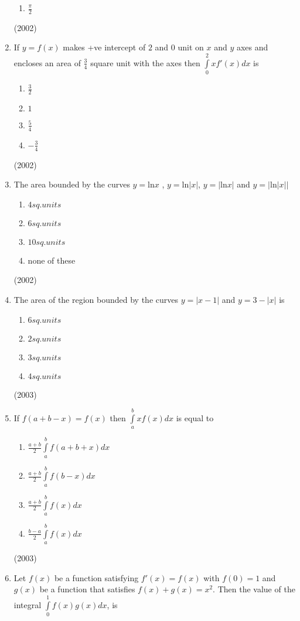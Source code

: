 \documentclass[journal,12pt,twocolumn]{IEEEtran}
\theoremstyle{remark}
\begin{document}
\begin{enumerate}
\begin{enumerate}
					\item $\frac{\pi}{2}$
			\end{enumerate}
			\hfill (2002)
	\item
	If $y=f(x)$ makes +ve intercept of $2$ and $0$ unit on $x$ and $y$ axes and encloses an area of $\frac{3}{4}$ square unit with the axes then $\int \limits_0^2 x f'(x)dx$ is
			\begin{enumerate}
				\item $\frac{3}{2}$
				\item $1$
				\item $\frac{5}{4}$
				\item $-\frac{3}{4}$
			\end{enumerate}
			\hfill (2002)
	\item
		The area bounded by the curves $y= \mathrm{ln} x$ , $y= \mathrm{ln} |x|$, $y=|\mathrm{ln}x|$ and $y=| \mathrm{ln} |x||$
			\begin{enumerate}
					\item $4 sq. units$
					\item $6 sq. units$
					\item $10 sq. units$
					\item none of these
			\end{enumerate}
			\hfill(2002)
	\item
		The area of the region bounded by the curves $y= |x-1|$ and $y=3-|x|$ is
			\begin {enumerate}
				\item $6 sq. units$
				\item $2 sq. units$
				\item $3 sq. units$
				\item $4 sq. units$
			\end {enumerate}
			\hfill (2003)
	\item
		If $f(a+b-x)=f(x)$ then $\int \limits_a^b xf(x)dx$ is equal to
			\begin {enumerate}
				\item $\frac{a+b}{2} \int \limits_a^b f(a+b+x)dx$
				\item $\frac{a+b}{2} \int \limits_a^b f(b-x)dx$
				\item $\frac{a+b}{2} \int \limits_a^b f(x)dx$
				\item $\frac{b-a}{2} \int \limits_a^b f(x)dx$
			\end {enumerate}
			\hfill (2003)
	\item 
		Let $f(x)$ be a function satisfying $f'(x) = f(x)$ with $f(0)=1$ and $g(x)$ be a function that satisfies $f(x) + g(x)=x^2$. Then the value of the integral $\int \limits_0^1 f(x)g(x)dx$, is

\end{enumerate}
\end{document}
